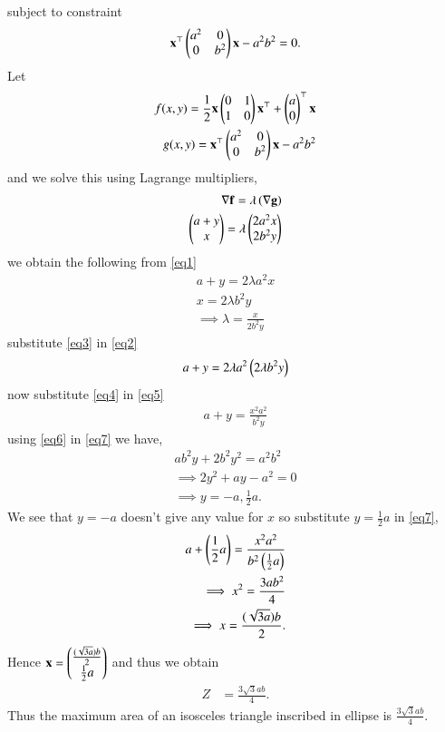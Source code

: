 \documentclass[journal,12pt,twocolumn]{IEEEtran}
\begin{document}
subject to constraint
\begin{align}
    \mathbf{x}^{\top}\begin{pmatrix}a^2 & 0 \\ 0 & b^2\end{pmatrix}\mathbf{x}-a^2b^2=0.\label{eq6}
\end{align}
Let
\begin{align}
    f(x,y)=\frac{1}{2}\mathbf{x}\begin{pmatrix}0&1 \\ 1&0\end{pmatrix}\mathbf{x}^{\top}+ \begin{pmatrix}a \\ 0\end{pmatrix}^{\top}\mathbf{x} \\
    g(x,y)=\mathbf{x}^{\top}\begin{pmatrix}a^2 & 0 \\ 0 & b^2\end{pmatrix}\mathbf{x}-a^2b^2
\end{align}
and we solve this using Lagrange multipliers,
\begin{align}
    \nabla \mathbf{f} = \lambda\left(\nabla \mathbf{g}\right) \\ 
    \begin{pmatrix}a+y \\ x\end{pmatrix} = \lambda \begin{pmatrix}2a^2x \\ 2b^2y\end{pmatrix} \label{eq1}
\end{align}
we obtain the following from \eqref{eq1}
\begin{align}
    a+y=2\lambda a^2x \label{eq2} \\ 
    x= 2\lambda b^2y \label{eq3} \\
    \implies \lambda = \frac{x}{2b^2y} \label{eq4}
\end{align}
substitute \eqref{eq3} in \eqref{eq2}
\begin{align}
    a+y = 2\lambda a^2\left(2\lambda b^2y\right) \label{eq5}
\end{align}    
now substitute \eqref{eq4} in \eqref{eq5}
\begin{align}
    a+y = \frac{x^2a^2}{b^2y} \label{eq7}
\end{align}
using \eqref{eq6} in \eqref{eq7} we have,
\begin{align}
  ab^2y+2b^2y^2=a^2b^2 \\
  \implies 2y^2+ay-a^2=0 \\
  \implies y = -a ,\frac{1}{2}a.
\end{align}
We see that $y=-a$ doesn't give any value for $x$ so substitute $y=\frac{1}{2}a$ in \eqref{eq7},
\begin{align}
    a+\left(\frac{1}{2}a\right) = \frac{x^2a^2}{b^2\left(\frac{1}{2}a\right)}
    \\ \implies x^2 = \frac{3ab^2}{4} \\
    \implies x= \frac{(\sqrt{3a})b}{2}.
\end{align}
Hence $\mathbf{x} = \begin{pmatrix}\frac{(\sqrt{3a})b}{2} \\ \frac{1}{2}a\end{pmatrix}$ and thus we obtain
\begin{equation}
\begin{aligned}
    Z &= \frac{3\sqrt{3}ab}{4}.
\end{aligned}
\end{equation}
Thus the maximum area of an isosceles triangle inscribed in ellipse is $\frac{3\sqrt{3}ab}{4}.$
\end{document}
